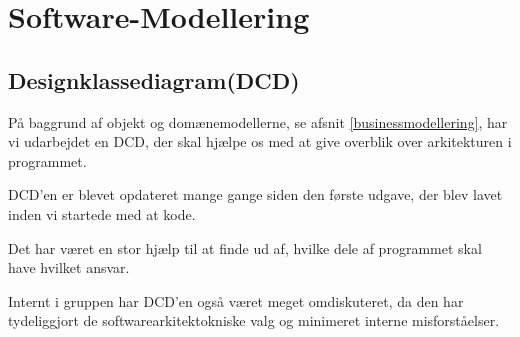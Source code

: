 \section{Software-Modellering}\label{softwaremodellering}

\subsection{Designklassediagram(DCD)}

På baggrund af objekt og domænemodellerne, se afsnit \ref{businessmodellering}, har vi udarbejdet en DCD, der skal hjælpe os med at give overblik over arkitekturen i programmet.

DCD'en er blevet opdateret mange gange siden den første udgave, der blev lavet inden vi startede med at kode.

Det har været en stor hjælp til at finde ud af, hvilke dele af programmet skal have hvilket ansvar.

Internt i gruppen har DCD'en også været meget omdiskuteret, da den har tydeliggjort de softwarearkitektokniske valg og minimeret interne misforståelser.

